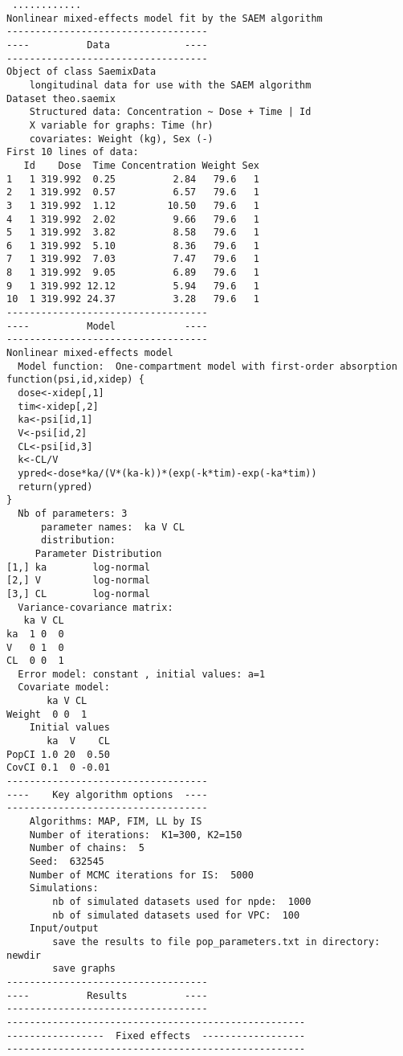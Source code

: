 \begin{verbatim}
 ............
Nonlinear mixed-effects model fit by the SAEM algorithm
-----------------------------------
----          Data             ----
-----------------------------------
Object of class SaemixData
    longitudinal data for use with the SAEM algorithm
Dataset theo.saemix 
    Structured data: Concentration ~ Dose + Time | Id 
    X variable for graphs: Time (hr) 
    covariates: Weight (kg), Sex (-) 
First 10 lines of data:
   Id    Dose  Time Concentration Weight Sex
1   1 319.992  0.25          2.84   79.6   1
2   1 319.992  0.57          6.57   79.6   1
3   1 319.992  1.12         10.50   79.6   1
4   1 319.992  2.02          9.66   79.6   1
5   1 319.992  3.82          8.58   79.6   1
6   1 319.992  5.10          8.36   79.6   1
7   1 319.992  7.03          7.47   79.6   1
8   1 319.992  9.05          6.89   79.6   1
9   1 319.992 12.12          5.94   79.6   1
10  1 319.992 24.37          3.28   79.6   1
-----------------------------------
----          Model            ----
-----------------------------------
Nonlinear mixed-effects model
  Model function:  One-compartment model with first-order absorption
function(psi,id,xidep) { 
  dose<-xidep[,1]
  tim<-xidep[,2]  
  ka<-psi[id,1]
  V<-psi[id,2]
  CL<-psi[id,3]
  k<-CL/V
  ypred<-dose*ka/(V*(ka-k))*(exp(-k*tim)-exp(-ka*tim))
  return(ypred)
}
  Nb of parameters: 3 
      parameter names:  ka V CL 
      distribution:
     Parameter Distribution
[1,] ka        log-normal  
[2,] V         log-normal  
[3,] CL        log-normal  
  Variance-covariance matrix:
   ka V CL
ka  1 0  0
V   0 1  0
CL  0 0  1
  Error model: constant , initial values: a=1 
  Covariate model:
       ka V CL
Weight  0 0  1
    Initial values
       ka  V    CL
PopCI 1.0 20  0.50
CovCI 0.1  0 -0.01
-----------------------------------
----    Key algorithm options  ----
-----------------------------------
    Algorithms: MAP, FIM, LL by IS 
    Number of iterations:  K1=300, K2=150 
    Number of chains:  5 
    Seed:  632545 
    Number of MCMC iterations for IS:  5000 
    Simulations:
        nb of simulated datasets used for npde:  1000 
        nb of simulated datasets used for VPC:  100 
    Input/output
        save the results to file pop_parameters.txt in directory:  newdir 
        save graphs
-----------------------------------
----          Results          ----
-----------------------------------
----------------------------------------------------
-----------------  Fixed effects  ------------------
----------------------------------------------------

\end{verbatim}
